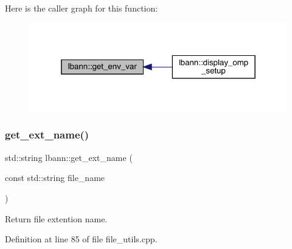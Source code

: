 Here is the caller graph for this function\+:\nopagebreak
\begin{figure}[H]
\begin{center}
\leavevmode
\includegraphics[width=319pt]{namespacelbann_aa4ee6571e54db5cee7f263029147e5f2_icgraph}
\end{center}
\end{figure}
\mbox{\label{namespacelbann_ad9a28639b0953886bbcb7fc366783a17}} 
\subsubsection{\texorpdfstring{get\+\_\+ext\+\_\+name()}{get\_ext\_name()}}
{\footnotesize\ttfamily std\+::string lbann\+::get\+\_\+ext\+\_\+name (\begin{DoxyParamCaption}\item[{const std\+::string}]{file\+\_\+name }\end{DoxyParamCaption})}



Return file extention name. 



Definition at line 85 of file file\+\_\+utils.\+cpp.


